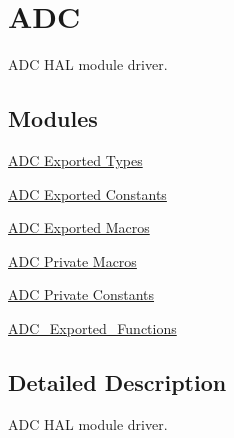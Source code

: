 \hypertarget{group___a_d_c}{}\section{A\+DC}
\label{group___a_d_c}


A\+DC H\+AL module driver.  


\subsection*{Modules}
\begin{DoxyCompactItemize}
\item 
\hyperlink{group___a_d_c___exported___types}{A\+D\+C Exported Types}
\item 
\hyperlink{group___a_d_c___exported___constants}{A\+D\+C Exported Constants}
\item 
\hyperlink{group___a_d_c___exported___macros}{A\+D\+C Exported Macros}
\item 
\hyperlink{group___a_d_c___private___macros}{A\+D\+C Private Macros}
\item 
\hyperlink{group___a_d_c___private___constants}{A\+D\+C Private Constants}
\item 
\hyperlink{group___a_d_c___exported___functions}{A\+D\+C\+\_\+\+Exported\+\_\+\+Functions}
\end{DoxyCompactItemize}


\subsection{Detailed Description}
A\+DC H\+AL module driver. 

